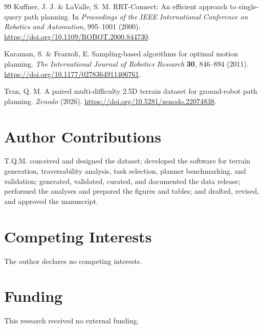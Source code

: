 \documentclass[11pt]{article}
\begin{document}
\begin{thebibliography}{99}
Kuffner, J. J. \& LaValle, S. M. RRT-Connect: An efficient approach to
single-query path planning. In \textit{Proceedings of the IEEE International
Conference on Robotics and Automation}, 995--1001 (2000).
\url{https://doi.org/10.1109/ROBOT.2000.844730}.

Karaman, S. \& Frazzoli, E. Sampling-based algorithms for optimal motion
planning. \textit{The International Journal of Robotics Research} \textbf{30},
846--894 (2011). \url{https://doi.org/10.1177/0278364911406761}.

Tran, Q. M. A paired multi-difficulty 2.5D terrain dataset for ground-robot
path planning. \textit{Zenodo} (2026).
\url{https://doi.org/10.5281/zenodo.22074838}.

\end{thebibliography}

\section*{Author Contributions}

T.Q.M. conceived and designed the dataset; developed the software for terrain
generation, traversability analysis, task selection, planner benchmarking, and
validation; generated, validated, curated, and documented the data release;
performed the analyses and prepared the figures and tables; and drafted,
revised, and approved the manuscript.

\section*{Competing Interests}

The author declares no competing interests.

\section*{Funding}

This research received no external funding.
\end{document}
